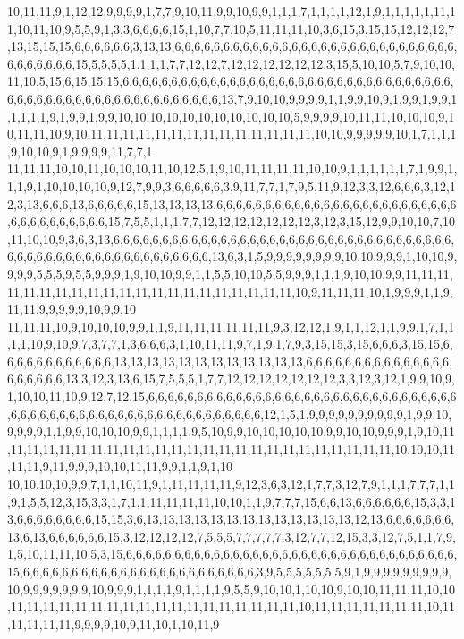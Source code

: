 10,11,11,9,1,12,12,9,9,9,9,1,7,7,9,10,11,9,9,10,9,9,1,1,1,7,1,1,1,1,12,1,9,1,1,1,1,1,11,11,10,11,10,9,5,5,9,1,3,3,6,6,6,6,15,1,10,7,7,10,5,11,11,11,10,3,6,15,3,15,15,12,12,12,7,13,15,15,15,6,6,6,6,6,6,3,13,13,6,6,6,6,6,6,6,6,6,6,6,6,6,6,6,6,6,6,6,6,6,6,6,6,6,6,6,6,6,6,6,6,6,6,6,6,15,5,5,5,5,1,1,1,1,7,7,12,12,7,12,12,12,12,12,12,3,15,5,10,10,5,7,9,10,10,11,10,5,15,6,15,15,15,6,6,6,6,6,6,6,6,6,6,6,6,6,6,6,6,6,6,6,6,6,6,6,6,6,6,6,6,6,6,6,6,6,6,6,6,6,6,6,6,6,6,6,6,6,6,6,6,6,6,6,6,6,6,6,6,13,7,9,10,10,9,9,9,9,1,1,9,9,10,9,1,9,9,1,9,9,1,1,1,1,1,9,1,9,9,1,9,9,10,10,10,10,10,10,10,10,10,10,10,5,9,9,9,9,10,11,11,10,10,10,9,10,11,11,10,9,10,11,11,11,11,11,11,11,11,11,11,11,11,11,11,10,10,9,9,9,9,9,10,1,7,1,1,1,9,10,10,9,1,9,9,9,9,11,7,7,1
11,11,11,10,10,11,10,10,10,11,10,12,5,1,9,10,11,11,11,11,10,10,9,1,1,1,1,1,1,7,1,9,9,1,1,1,9,1,10,10,10,10,9,12,7,9,9,3,6,6,6,6,6,3,9,11,7,7,1,7,9,5,11,9,12,3,3,12,6,6,6,3,12,12,3,13,6,6,6,13,6,6,6,6,6,15,13,13,13,13,6,6,6,6,6,6,6,6,6,6,6,6,6,6,6,6,6,6,6,6,6,6,6,6,6,6,6,6,6,6,6,6,6,6,6,15,7,5,5,1,1,1,7,7,12,12,12,12,12,12,12,3,12,3,15,12,9,9,10,10,7,10,11,10,10,9,3,6,3,13,6,6,6,6,6,6,6,6,6,6,6,6,6,6,6,6,6,6,6,6,6,6,6,6,6,6,6,6,6,6,6,6,6,6,6,6,6,6,6,6,6,6,6,6,6,6,6,6,6,6,6,6,6,6,6,6,13,6,3,1,5,9,9,9,9,9,9,9,9,10,10,9,9,9,1,10,10,9,9,9,9,5,5,5,9,5,5,9,9,9,1,9,10,10,9,9,1,1,5,5,10,10,5,5,9,9,9,1,1,1,9,10,10,9,9,11,11,11,11,11,11,11,11,11,11,11,11,11,11,11,11,11,11,11,11,11,10,9,11,11,11,10,1,9,9,9,1,1,9,11,11,9,9,9,9,9,10,9,9,10
11,11,11,10,9,10,10,10,9,9,1,1,9,11,11,11,11,11,11,9,3,12,12,1,9,1,1,12,1,1,9,9,1,7,1,1,1,1,10,9,10,9,7,3,7,7,1,3,6,6,6,3,1,10,11,11,9,7,1,9,1,7,9,3,15,15,3,15,6,6,6,3,15,15,6,6,6,6,6,6,6,6,6,6,6,6,13,13,13,13,13,13,13,13,13,13,13,13,6,6,6,6,6,6,6,6,6,6,6,6,6,6,6,6,6,6,6,6,6,13,3,12,3,13,6,15,7,5,5,5,1,7,7,12,12,12,12,12,12,12,3,3,12,3,12,1,9,9,10,9,1,10,10,11,10,9,12,7,12,15,6,6,6,6,6,6,6,6,6,6,6,6,6,6,6,6,6,6,6,6,6,6,6,6,6,6,6,6,6,6,6,6,6,6,6,6,6,6,6,6,6,6,6,6,6,6,6,6,6,6,6,6,6,6,6,6,6,6,12,1,5,1,9,9,9,9,9,9,9,9,9,9,1,9,9,10,9,9,9,9,1,1,9,9,10,10,10,9,9,1,1,1,1,9,5,10,9,9,10,10,10,10,10,9,9,10,10,9,9,9,1,9,10,11,11,11,11,11,11,11,11,11,11,11,11,11,11,11,11,11,11,11,11,11,11,11,11,11,10,10,10,11,11,11,9,11,9,9,9,10,10,11,11,9,9,1,1,9,1,10
10,10,10,10,9,9,7,1,1,10,11,9,1,11,11,11,11,9,12,3,6,3,12,1,7,7,3,12,7,9,1,1,1,7,7,7,1,1,9,1,5,5,12,3,15,3,3,1,7,1,1,11,11,11,11,10,10,1,1,9,7,7,7,15,6,6,13,6,6,6,6,6,6,15,3,3,13,6,6,6,6,6,6,6,6,15,15,3,6,13,13,13,13,13,13,13,13,13,13,13,13,13,12,13,6,6,6,6,6,6,6,13,6,13,6,6,6,6,6,6,15,3,12,12,12,12,7,5,5,5,7,7,7,7,7,3,12,7,7,12,15,3,3,12,7,5,1,1,7,9,1,5,10,11,11,10,5,3,15,6,6,6,6,6,6,6,6,6,6,6,6,6,6,6,6,6,6,6,6,6,6,6,6,6,6,6,6,6,6,6,6,6,6,15,6,6,6,6,6,6,6,6,6,6,6,6,6,6,6,6,6,6,6,6,6,6,6,6,3,9,5,5,5,5,5,5,5,9,1,9,9,9,9,9,9,9,9,9,10,9,9,9,9,9,9,9,10,9,9,9,1,1,1,1,9,1,1,1,1,9,5,5,9,10,10,1,10,10,9,10,10,11,11,11,10,10,11,11,11,11,11,11,11,11,11,11,11,11,11,11,11,11,11,11,10,11,11,11,11,11,11,11,10,11,11,11,11,11,9,9,9,9,10,9,11,10,1,10,11,9
